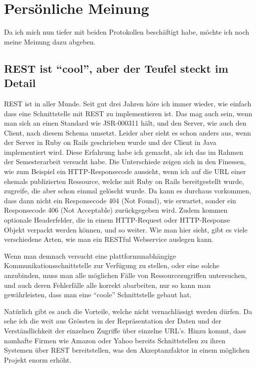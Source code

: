 \documentclass[abstracton, listof=totocnumbered,
bibliography=totocnumbered]{scrreprt}
\begin{document}
  \clearpage
 
  \section{Persönliche Meinung}
  
  Da ich mich nun tiefer mit beiden Protokollen beschäftigt habe, möchte ich
  noch meine Meinung dazu abgeben.
  
  \subsection{REST ist ``cool'', aber der Teufel steckt im Detail}
  
  REST ist in aller Munde. Seit gut drei Jahren höre ich immer wieder, wie
  einfach dass eine Schnittstelle mit REST zu implementieren ist. Das mag auch
  sein, wenn man sich an einen Standard wie JSR-000311\cite{JSR311} hält, und
  den Server, wie auch den Client, nach diesem Schema umsetzt. Leider aber sieht
  es schon anders aus, wenn der Server in Ruby on Rails\cite{RoR} geschrieben
  wurde und der Client in Java implementiert wird. Diese Erfahrung habe ich
  gemacht, als ich das im Rahmen der Semesterarbeit versucht habe. Die
  Unterschiede zeigen sich in den Finessen, wie zum Beispiel ein
  HTTP-Responsecode aussieht, wenn ich auf die \ac{URL} einer ehemals
  publizierten Ressource, welche mit Ruby on Rails bereitgestellt wurde,
  zugreife, die aber schon einmal gelöscht wurde. Da kann es durchaus
  vorkommen, dass dann nicht ein Responsecode 404 (Not Found), wie erwartet, 
  sonder ein Responsecode 406 (Not Acceptable) zurückgegeben wird. Zudem kommen
  optionale Headerfelder, die in einem HTTP-Request oder HTTP-Response Objekt verpackt
  werden können, und so weiter. Wie man hier sieht, gibt es viele verschiedene
  Arten, wie man ein RESTful Webservice auslegen kann.
  
  Wenn man demnach versucht eine plattformunabhängige
  Kommunikationsschnittstelle zur Verfügung zu stellen, oder eine solche
  anzubinden, muss man alle möglichen Fälle von Ressourcezugriffen untersuchen,
  und auch deren Fehlerfälle alle korrekt abarbeiten, nur so kann man
  gewährleisten, dass man eine ``coole'' Schnittstelle gebaut hat.
  
  Natürlich gibt es auch die Vorteile, welche nicht vernachlässigt werden
  dürfen. Da sehe ich die weit aus Grössten in der Repräsentation der Daten und
  der Verständlichkeit der einzelnen Zugriffe über einzelne \ac{URL}'s. Hinzu
  kommt, dass namhafte Firmen wie Amazon oder Yahoo bereits Schnittstellen zu
  ihren Systemen über REST bereitstellen, was den Akzeptanzfaktor in einem
  möglichen Projekt enorm erhöht.
\end{document}
